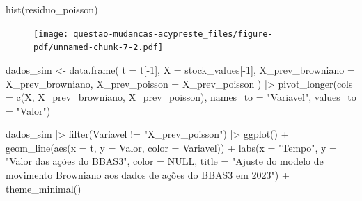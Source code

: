 \documentclass[
  letterpaper,
  DIV=11,
  numbers=noendperiod]{scrreprt}
\newenvironment{Shaded}{\begin{snugshade}}{\end{snugshade}}
\newcommand{\AttributeTok}[1]{\textcolor[rgb]{0.40,0.45,0.13}{#1}}
\newcommand{\ConstantTok}[1]{\textcolor[rgb]{0.56,0.35,0.01}{#1}}
\newcommand{\DecValTok}[1]{\textcolor[rgb]{0.68,0.00,0.00}{#1}}
\newcommand{\FunctionTok}[1]{\textcolor[rgb]{0.28,0.35,0.67}{#1}}
\newcommand{\NormalTok}[1]{\textcolor[rgb]{0.00,0.23,0.31}{#1}}
\newcommand{\OtherTok}[1]{\textcolor[rgb]{0.00,0.23,0.31}{#1}}
\newcommand{\SpecialCharTok}[1]{\textcolor[rgb]{0.37,0.37,0.37}{#1}}
\newcommand{\StringTok}[1]{\textcolor[rgb]{0.13,0.47,0.30}{#1}}
\begin{document}
\begin{Shaded}
\begin{Highlighting}[]
\FunctionTok{hist}\NormalTok{(residuo\_poisson)}
\end{Highlighting}
\end{Shaded}

\begin{figure}[H]

{\centering \texttt{[image: questao-mudancas-acypreste\_files/figure-pdf/unnamed-chunk-7-2.pdf]}

}

\end{figure}

\begin{Shaded}
\begin{Highlighting}[]
\NormalTok{dados\_sim }\OtherTok{\textless{}{-}} \FunctionTok{data.frame}\NormalTok{(}
    \AttributeTok{t =}\NormalTok{ t[}\SpecialCharTok{{-}}\DecValTok{1}\NormalTok{],}
    \AttributeTok{X =}\NormalTok{ stock\_values[}\SpecialCharTok{{-}}\DecValTok{1}\NormalTok{],}
    \AttributeTok{X\_prev\_browniano =}\NormalTok{ X\_prev\_browniano,}
    \AttributeTok{X\_prev\_poisson =}\NormalTok{ X\_prev\_poisson}
\NormalTok{) }\SpecialCharTok{|\textgreater{}} 
\FunctionTok{pivot\_longer}\NormalTok{(}\AttributeTok{cols =} \FunctionTok{c}\NormalTok{(X, X\_prev\_browniano, X\_prev\_poisson),}
             \AttributeTok{names\_to =} \StringTok{"Variavel"}\NormalTok{,}
             \AttributeTok{values\_to =} \StringTok{"Valor"}\NormalTok{) }
\end{Highlighting}
\end{Shaded}

\begin{Shaded}
\begin{Highlighting}[]
\NormalTok{dados\_sim }\SpecialCharTok{|\textgreater{}} 
    \FunctionTok{filter}\NormalTok{(Variavel }\SpecialCharTok{!=} \StringTok{"X\_prev\_poisson"}\NormalTok{) }\SpecialCharTok{|\textgreater{}} 
    \FunctionTok{ggplot}\NormalTok{() }\SpecialCharTok{+}
    \FunctionTok{geom\_line}\NormalTok{(}\FunctionTok{aes}\NormalTok{(}\AttributeTok{x =}\NormalTok{ t, }\AttributeTok{y =}\NormalTok{ Valor, }\AttributeTok{color =}\NormalTok{ Variavel)) }\SpecialCharTok{+}
    \FunctionTok{labs}\NormalTok{(}\AttributeTok{x =} \StringTok{"Tempo"}\NormalTok{,}
         \AttributeTok{y =} \StringTok{"Valor das ações do BBAS3"}\NormalTok{,}
         \AttributeTok{color =} \ConstantTok{NULL}\NormalTok{,}
         \AttributeTok{title =} \StringTok{"Ajuste do modelo de movimento Browniano}
\StringTok{          aos dados de ações do BBAS3 em 2023"}\NormalTok{) }\SpecialCharTok{+}
    \FunctionTok{theme\_minimal}\NormalTok{()}
\end{Highlighting}
\end{Shaded}
\end{document}
